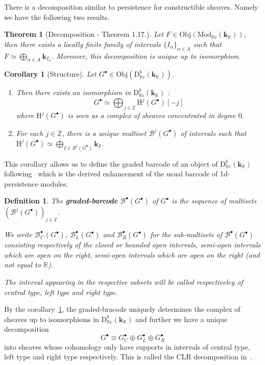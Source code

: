 \documentclass[a4paper, english, 11pt]{article}
\newcommand{\kk}[0]{\textbf{k}}
\newcommand{\Mod}[0]{\text{Mod}}
\newcommand{\0}{\vec{0}}
\newcommand{\R}[0]{\mathbb{R}}
\newcommand{\Z}[0]{\mathbb{Z}}
\newcommand{\B}[0]{\mathcal{B}}
\newcommand{\D}[0]{\text{D}}
\newcommand{\Obj}[0]{\text{Obj}}
\newcommand{\Ho}[0]{\text{H}}
\newtheorem{cor}[prop]{Corollary}
\newtheorem{defi}[prop]{Definition}
\newtheorem{thm}[prop]{Theorem}
\begin{document}
There is a decomposition similar to persistence for constructible sheaves. Namely we have the following two results.
\begin{thm}[Decomposition - \cite{KS18} Theorem 1.17.]\label{T:KSdecomposition}
Let $F \in \Obj(\Mod_{\R c}(\kk_\R))$, then there exists a locally finite family of intervals $\{I_\alpha\}_{\alpha \in A}$ such that $F \simeq \mathop{\bigoplus}\limits_{\alpha \in A} \kk_{I_\alpha}$. Moreover, this decomposition is unique up to isomorphism.
\end{thm}
\begin{cor}[Structure]\label{T:KSstructure}
Let $G^\bullet\in \Obj(\D^b_{\R c}(\kk_\R))$. 
\begin{enumerate} \item Then there exists an isomorphism in $\D^b_{\R c}(\kk_\R)$ : $$G^\bullet \simeq \bigoplus_{j\in\Z} \Ho^j(G^\bullet)[-j]$$
where $\Ho^j(G^\bullet)$ is seen as a complex of sheaves concentrated in degree $0$.
\item For each $j\in \Z$, there is a unique multiset $\B^j(G^\bullet) $ of intervals such that  $\Ho^j(G^\bullet)\simeq \bigoplus_{I \in \B^j(G^\bullet)} \kk_{I}$. 
\end{enumerate}\end{cor}
This corollary allows us to define the graded barcode of an object of $\D^b_{\R c}(\kk_\R)$ following~\cite{Berk18} which is the  derived enhancement of the usual barcode of 1d-persistence modules.
\begin{defi}\label{D:gradedbarcode}
 The \textbf{graded-barcode} $\B^\bullet(G^\bullet)$ of $G^\bullet$ is the sequence of multisets $(\B^j(G^\bullet))_{j\in \Z}$.
 
We write $\B_C^\bullet(G^\bullet)$, $\B_L^\bullet(G^\bullet)$ and $\B_R^\bullet(G^\bullet)$ for the  sub-multisets of $\B^\bullet(G^\bullet)$ consisting respectively of the closed or bounded open intervals, semi-open intervals which are open on the right,  semi-open intervals which are open on the right (and not equal to $\R$). 

The interval appearing in the respective subsets will be called respectiveley of central type, left type and right type.
 \end{defi}
By the corollary~\ref{T:KSstructure}, the graded-bracode uniquely determines the complex of sheaves up to isomorphisms in $\D^b_{\R c}(\kk_\R)$ and further we have a unique decomposition $$G^\bullet \cong G_C^\bullet \oplus G_L^\bullet \oplus G_R^\bullet $$ into sheaves whose cohomology only have supports    
in intervals of central type, left type and right type respectively. This is called the CLR decomposition in~\cite{Berk18}.
\end{document}

